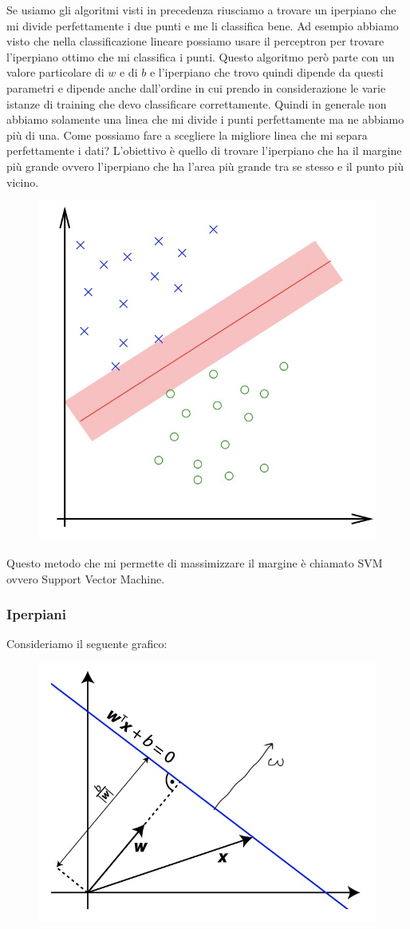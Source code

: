 \documentclass[14pt]{extreport}
\begin{document}
Se usiamo gli algoritmi visti in precedenza riusciamo a trovare un iperpiano che mi divide perfettamente i due punti e me li classifica bene. Ad
esempio abbiamo visto che nella classificazione lineare possiamo usare il perceptron per trovare l'iperpiano ottimo che mi classifica i punti. Questo
algoritmo però parte con un valore particolare di $w$ e di $b$ e l'iperpiano che trovo quindi dipende da questi parametri e dipende anche dall'ordine
in cui prendo in considerazione le varie istanze di training che devo classificare correttamente. Quindi in generale non abbiamo solamente una linea
che mi divide i punti perfettamente ma ne abbiamo più di una. Come possiamo fare a scegliere la migliore linea che mi separa perfettamente i dati?
L'obiettivo è quello di trovare l'iperpiano che ha il margine più grande ovvero l'iperpiano che ha l'area più grande tra se stesso e il punto più
vicino.

\begin{figure}[H]
	\centering
	\includegraphics[width=0.4\linewidth]{311.jpeg}
\end{figure}

Questo metodo che mi permette di massimizzare il margine è chiamato SVM ovvero Support Vector Machine.

\subsubsection{Iperpiani}

Consideriamo il seguente grafico:

\begin{figure}[H]
	\centering
	\includegraphics[width=0.4\linewidth]{312.jpeg}
\end{figure}
\end{document}

